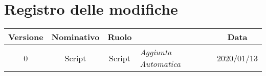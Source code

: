 \section*{Registro delle modifiche}
\renewcommand{\arraystretch}{1.8}

    \begin{longtable}{|c|c|c|p{3.8cm}|c|}
        \hline
        \rowcolor{header}
        \textbf{Versione} & \textbf{Nominativo} & \textbf{Ruolo} & \centering{\textbf{Descrizione}} & \textbf{Data} \\ 
        \hline 
        0 & Script & Script & \small{\textit{ Aggiunta Automatica }} & 2020/01/13 \\ 
        \hline
    \end{longtable}